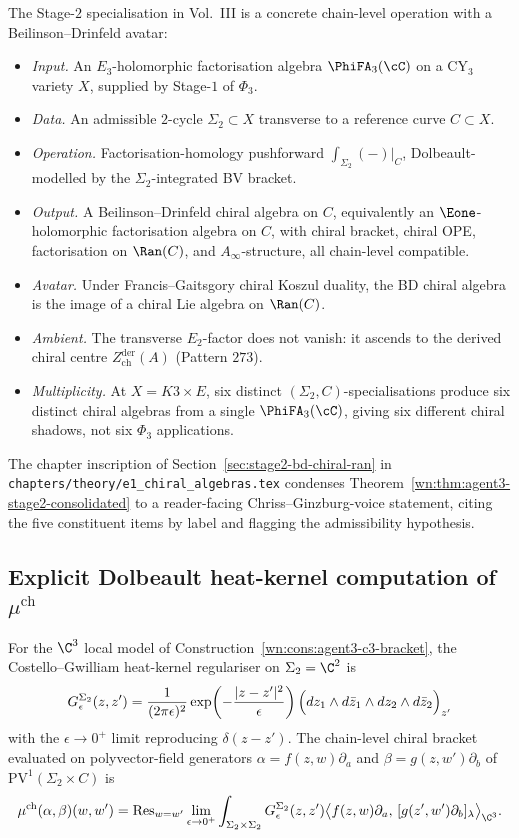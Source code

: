 The Stage-$2$ specialisation in Vol.~III is a concrete chain-level operation with a Beilinson--Drinfeld avatar:
\begin{itemize}
\item \emph{Input.} An $E_3$-holomorphic factorisation algebra $\PhiFA_3(\cC)$ on a CY$_3$ variety $X$, supplied by Stage-$1$ of $\Phi_3$.
\item \emph{Data.} An admissible $2$-cycle $\Sigma_2\subset X$ transverse to a reference curve $C\subset X$.
\item \emph{Operation.} Factorisation-homology pushforward $\int_{\Sigma_2}(-)|_C$, Dolbeault-modelled by the $\Sigma_2$-integrated BV bracket.
\item \emph{Output.} A Beilinson--Drinfeld chiral algebra on $C$, equivalently an $\Eone$-holomorphic factorisation algebra on $C$, with chiral bracket, chiral OPE, factorisation on $\Ran(C)$, and $A_\infty$-structure, all chain-level compatible.
\item \emph{Avatar.} Under Francis--Gaitsgory chiral Koszul duality, the BD chiral algebra is the image of a chiral Lie algebra on $\Ran(C)$.
\item \emph{Ambient.} The transverse $E_2$-factor does not vanish: it ascends to the derived chiral centre $Z^{\mathrm{der}}_{\mathrm{ch}}(A)$ (Pattern $273$).
\item \emph{Multiplicity.} At $X=K3\times E$, six distinct $(\Sigma_2,C)$-specialisations produce six distinct chiral algebras from a single $\PhiFA_3(\cC)$, giving six different chiral shadows, not six $\Phi_3$ applications.
\end{itemize}

The chapter inscription of Section~\ref{sec:stage2-bd-chiral-ran} in \texttt{chapters/theory/e1\_chiral\_algebras.tex} condenses Theorem~\ref{wn:thm:agent3-stage2-consolidated} to a reader-facing Chriss--Ginzburg-voice statement, citing the five constituent items by label and flagging the admissibility hypothesis.

\subsection{Explicit Dolbeault heat-kernel computation of \texorpdfstring{$\mu^{\mathrm{ch}}$}{mu-ch}}
\label{wn:subsec:agent3-explicit-heat-kernel}

For the $\C^3$ local model of Construction~\ref{wn:cons:agent3-c3-bracket}, the Costello--Gwilliam heat-kernel regulariser on $\Sigma_2=\C^2$ is
\[
 G_\epsilon^{\Sigma_2}(z,z')
 =\frac{1}{(2\pi\epsilon)^2}
 \exp\!\left(-\frac{|z-z'|^2}{\epsilon}\right)
 \Bigl(dz_1\wedge d\bar z_1\wedge dz_2\wedge d\bar z_2\Bigr)_{z'}
\]
with the $\epsilon\to 0^+$ limit reproducing $\delta(z-z')$. The chain-level chiral bracket evaluated on polyvector-field generators $\alpha=f(z,w)\partial_a$ and $\beta=g(z,w')\partial_b$ of $\mathrm{PV}^1(\Sigma_2\times C)$ is
\[
 \mu^{\mathrm{ch}}(\alpha,\beta)(w,w')
 =\mathrm{Res}_{w=w'}\lim_{\epsilon\to 0^+}
 \int_{\Sigma_2\times\Sigma_2}
 G_\epsilon^{\Sigma_2}(z,z')
 \bigl\langle f(z,w)\partial_a,\,[g(z',w')\partial_b]_\lambda\bigr\rangle_{\C^3}.
\]

